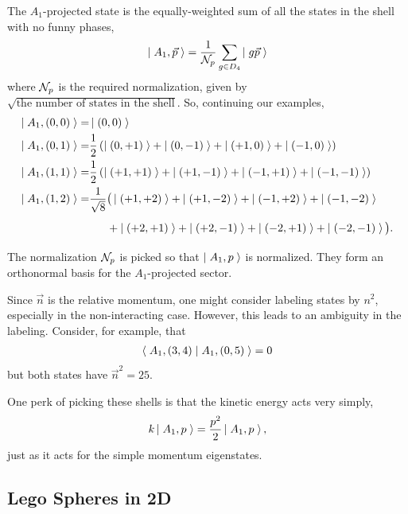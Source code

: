 The $A_1$-projected state is the equally-weighted sum of all the states in the shell with no funny phases,
\begin{align}
    \left|\;A_1, \vec{p}\;\right\rangle = \frac{1}{\mathcal{N}_{p}} \sum_{g\in D_4} \left|\;g\vec{p}\;\right\rangle
\end{align}
where $\mathcal{N}_{p}$ is the required normalization, given by $\sqrt{\textrm{the number of states in the shell}}$.
So, continuing our examples,
\begin{align}
    \ket{A_1, (0,0)} =& \ket{(0,0)}
    \\
    \ket{A_1, (0,1)} =& \frac{1}{2}\left(\ket{(0,+1)} + \ket{(0,-1)} + \ket{(+1,0)} + \ket{(-1,0)} \right)
    \\
    \ket{A_1, (1,1)} =& \frac{1}{2}\left(\ket{(+1,+1)} + \ket{(+1,-1)} + \ket{(-1,+1)} + \ket{(-1,-1)} \right)
    \\
    \ket{A_1, (1,2)} =& \frac{1}{\sqrt{8}}\big(\ket{(+1,+2)} + \ket{(+1,-2)} + \ket{(-1,+2)} + \ket{(-1,-2)} \nonumber\\
                     &\phantom{\frac{1}{\sqrt{8}}}+ \ket{(+2,+1)} + \ket{(+2,-1)} + \ket{(-2,+1)} + \ket{(-2,-1)} \big).
\end{align}
The normalization $\mathcal{N}_{p}$ is picked so that $\left|\;A_1, p\;\right\rangle$ is normalized.
They form an orthonormal basis for the $A_1$-projected sector.

Since $\vec{n}$ is the relative momentum, one might consider labeling states by $n^2$, especially in the non-interacting case.
However, this leads to an ambiguity in the labeling.
Consider, for example, that
\begin{align}
    \left\langle\;A_1, (3,4)\;\middle|\;A_1, (0,5)\;\right\rangle = 0
\end{align}
but both states have $\vec{n}^2=25$.

One perk of picking these shells is that the kinetic energy acts very simply,
\begin{align}
    k \left|\;A_1, p\;\right\rangle = \frac{p^2}{2} \left|\;A_1, p\;\right\rangle,
\end{align}
just as it acts for the simple momentum eigenstates.

\subsection{Lego Spheres in 2D}\label{sec:Lego spheres}

